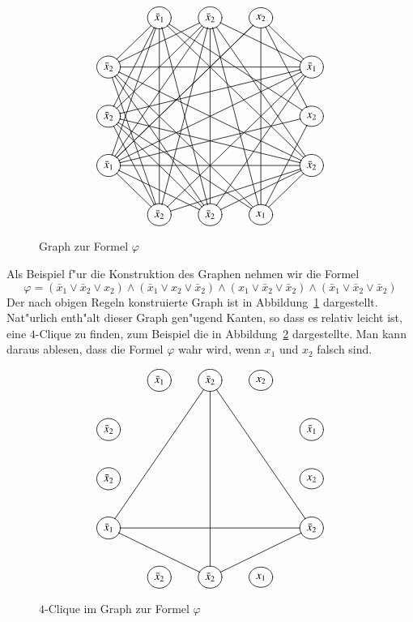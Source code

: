 \begin{beispiel}
\begin{figure}
\[
\entrymodifiers={++[o][F]}
\xymatrix{
*+\txt{}
	&{\bar x_1}
		\ar@{-}[dl] \ar@{-}[ddl] \ar@{-}[dddl]
		\ar@{-}[dddd] \ar@{-}[ddddr] 
		\ar@{-}[ddrrr] \ar@{-}[dddrrr]
		&{\bar x_2}
			\ar@{-}[dddll]
			\ar@{-}[ddddl] \ar@{-}[dddd] \ar@{-}[ddddr]
			\ar@{-}[drr] \ar@{-}[dddrr]
			\ar@{-}[dll] \ar@{-}[ddll]
			&{x_2}
				\ar@{-}[dddlll] \ar@{-}[dddlll]
				\ar@{-}[dddd]
				\ar@{-}[dr] \ar@{-}[ddr]
\\
{\bar x_2}
	\ar@{-}[rrrr] \ar@{-}[rrrrdd]
	\ar@{-}[dddr] \ar@{-}[dddrr] \ar@{-}[dddrrr]
	&*+\txt{}
		&*+\txt{}
			&*+\txt{}
				&{\bar x_1}
					\ar@{-}[dllll] \ar@{-}[ddllll]
					\ar@{-}[dddlll] \ar@{-}[dddll]
\\
{\bar x_2}
	\ar@{-}[rrrrd]
	\ar@{-}[ddr] \ar@{-}[ddrr] \ar@{-}[ddrrr]
	&*+\txt{}
		&*+\txt{}
			&*+\txt{}
				&{x_2}
					\ar@{-}[dllll]
					\ar@{-}[ddl]
\\
{\bar x_1}
	\ar@{-}[rrrr]
	\ar@{-}[dr] \ar@{-}[drr]
	&*+\txt{}
		&*+\txt{}
			&*+\txt{}
				&{\bar x_2}
					\ar@{-}[dlll] \ar@{-}[dll] \ar@{-}[dl]
\\
*+\txt{}
	&{\bar x_2}
		&{\bar x_2}
			&{x_1}
}
\]
\caption{Graph zur Formel $\varphi$\label{phiformel}}
\end{figure}%
Als Beispiel f"ur die Konstruktion des Graphen nehmen wir die Formel
\[
\varphi
=
(\bar x_1\vee \bar x_2\vee x_2)
\wedge
(\bar x_1\vee x_2\vee \bar x_2)
\wedge
(x_1\vee \bar x_2\vee \bar x_2)
\wedge
(\bar x_1\vee \bar x_2\vee \bar x_2)
\]
Der nach obigen Regeln konstruierte Graph ist in Abbildung~\ref{phiformel}
dargestellt.
Nat"urlich enth"alt dieser Graph gen"ugend Kanten, so dass es relativ
leicht ist, eine $4$-Clique zu finden, zum Beispiel die in Abbildung~\ref{phiclique} dargestellte. Man kann daraus ablesen, dass die Formel $\varphi$
wahr wird, wenn $x_1$ und $x_2$ falsch sind.
\begin{figure}
\[
\entrymodifiers={++[o][F]}
\xymatrix{
*+\txt{}
	&{\bar x_1}
		&{\bar x_2}
			\ar@{-}[dddll]
			\ar@{-}[dddd]
			\ar@{-}[dddrr]
			&{x_2}
\\
{\bar x_2}
	&*+\txt{}
		&*+\txt{}
			&*+\txt{}
				&{\bar x_1}
\\
{\bar x_2}
	&*+\txt{}
		&*+\txt{}
			&*+\txt{}
				&{x_2}
\\
{\bar x_1}
	\ar@{-}[rrrr]
	\ar@{-}[drr]
	&*+\txt{}
		&*+\txt{}
			&*+\txt{}
				&{\bar x_2}
					\ar@{-}[dll]
\\
*+\txt{}
	&{\bar x_2}
		&{\bar x_2}
			&{x_1}
}
\]
\caption{$4$-Clique im Graph zur Formel $\varphi$\label{phiclique}}
\end{figure}%
\end{beispiel}

